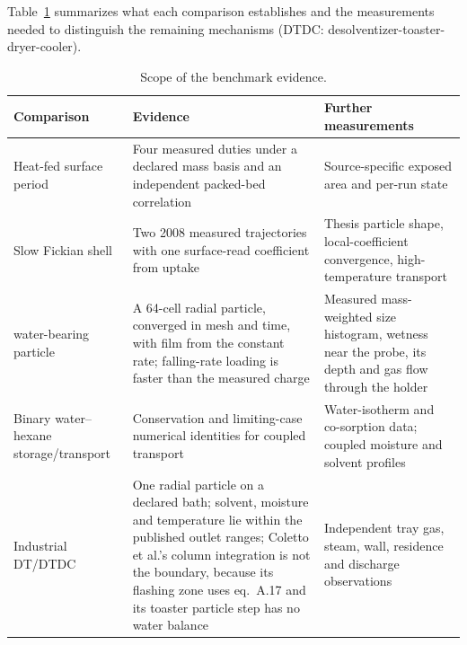 \documentclass[11pt]{article}
\begin{document}
Table~\ref{tab:sub:scope} summarizes what each comparison establishes and
the measurements needed to distinguish the remaining mechanisms (DTDC:
desolventizer-toaster-dryer-cooler).

\begin{table}[htbp]\centering\footnotesize
\caption{Scope of the benchmark evidence.}\label{tab:sub:scope}
\begin{tabular}{@{}>{\raggedright\arraybackslash}p{}>{\raggedright\arraybackslash}p{}>{\raggedright\arraybackslash}p{}@{}}\toprule
Comparison & Evidence & Further measurements\\\midrule
Heat-fed surface period & Four measured duties under a declared mass basis and an independent packed-bed correlation & Source-specific exposed area and per-run state\\
Slow Fickian shell & Two 2008 measured trajectories with one surface-read coefficient from uptake & Thesis particle shape, local-coefficient convergence, high-temperature transport\\
2019 water-bearing particle & A 64-cell radial particle, converged in mesh and time, with film from the constant rate; falling-rate loading is faster than the measured charge & Measured mass-weighted size histogram, wetness near the probe, its depth and gas flow through the holder\\
Binary water--hexane storage/transport & Conservation and limiting-case numerical identities for coupled transport & Water-isotherm and co-sorption data; coupled moisture and solvent profiles\\
Industrial DT/DTDC & One radial particle on a declared bath; solvent, moisture and temperature lie within the published outlet ranges; Coletto et al.'s column integration is not the boundary, because its flashing zone uses eq.~A.17 and its toaster particle step has no water balance & Independent tray gas, steam, wall, residence and discharge observations\\
\bottomrule\end{tabular}\end{table}
\end{document}
